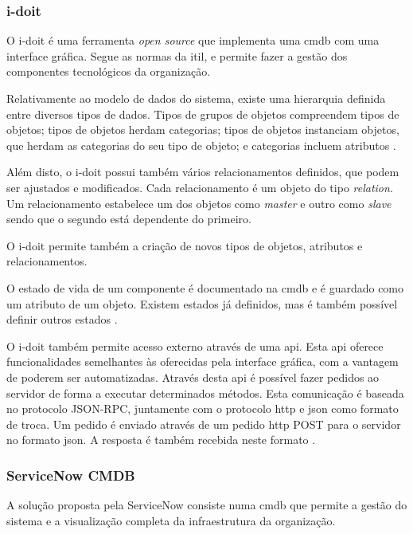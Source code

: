 \documentclass[
  oneside,
  11pt, a4paper,
  footinclude=true,
  headinclude=true,
  cleardoublepage=empty
]{scrbook}
\begin{document}
\subsubsection{\textbf{i-doit}}
 
    O i-doit \cite{idoit} é uma ferramenta \textit{open source} que implementa uma \gls{cmdb} com uma interface gráfica. Segue as normas da \gls{itil}, e permite fazer a gestão dos componentes tecnológicos da organização. 
    
    Relativamente ao modelo de dados do sistema, existe uma hierarquia definida entre diversos tipos de dados. Tipos de grupos de objetos compreendem tipos de objetos; tipos de objetos herdam categorias; tipos de objetos instanciam objetos, que herdam as categorias do seu tipo de objeto; e categorias incluem atributos \cite{idoitkb}. 
    
    Além disto, o i-doit possui também vários relacionamentos definidos, que podem ser ajustados e modificados. Cada relacionamento é um objeto do tipo \textit{relation}. Um relacionamento estabelece um dos objetos como \textit{master} e outro como \textit{slave} sendo que o segundo está dependente do primeiro. 
    
    O i-doit permite também a criação de novos tipos de objetos, atributos e relacionamentos.
    
    O estado de vida de um componente é documentado na \gls{cmdb} e é guardado como um atributo de um objeto. Existem estados já definidos, mas é também possível definir outros estados \cite{idoitkb}.
    
    O i-doit também permite acesso externo através de uma \gls{api}. Esta \gls{api} oferece funcionalidades semelhantes às oferecidas pela interface gráfica, com a vantagem de poderem ser automatizadas. Através desta \gls{api} é possível fazer pedidos ao servidor de forma a executar determinados métodos. Esta comunicação é baseada no protocolo JSON-RPC, juntamente com o protocolo \gls{http} e \gls{json} como formato de troca. Um pedido é enviado através de um pedido \gls{http} POST para o servidor no formato \gls{json}. A resposta é também recebida neste formato \cite{idoitkb}.

\subsubsection{\textbf{ServiceNow CMDB}}

    A solução proposta pela ServiceNow \cite{servicenow} consiste numa \gls{cmdb} que permite a gestão do sistema e a visualização completa da infraestrutura da organização.
    
\end{document}

